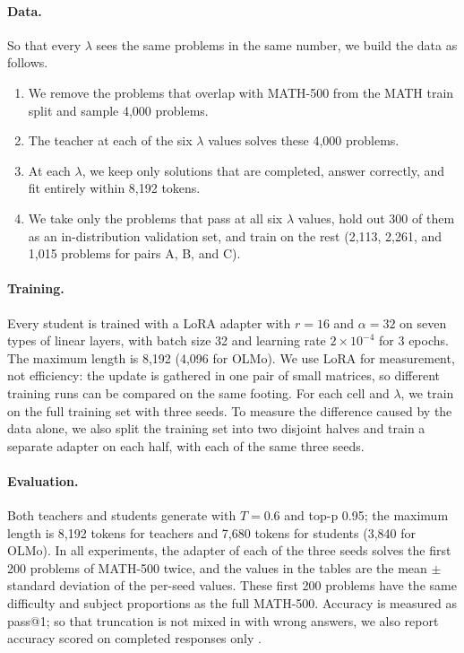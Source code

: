 \paragraph{Data.}
So that every $\lambda$ sees the same problems in the same number, we build the data as follows.
\begin{enumerate}
  \item We remove the problems that overlap with MATH-500 from the MATH train split and sample 4,000 problems.
  \item The teacher at each of the six $\lambda$ values solves these 4,000 problems.
  \item At each $\lambda$, we keep only solutions that are completed, answer correctly, and fit entirely within 8,192 tokens.
  \item We take only the problems that pass at all six $\lambda$ values, hold out 300 of them as an in-distribution validation set, and train on the rest (2,113, 2,261, and 1,015 problems for pairs A, B, and C).
\end{enumerate}

\paragraph{Training.}
Every student is trained with a LoRA adapter with $r=16$ and $\alpha=32$ on seven types of linear layers, with batch size 32 and learning rate $2\times10^{-4}$ for 3 epochs. The maximum length is 8,192 (4,096 for OLMo).
We use LoRA for measurement, not efficiency: the update is gathered in one pair of small matrices, so different training runs can be compared on the same footing.
For each cell and $\lambda$, we train on the full training set with three seeds. To measure the difference caused by the data alone, we also split the training set into two disjoint halves and train a separate adapter on each half, with each of the same three seeds.

\paragraph{Evaluation.}
Both teachers and students generate with $T=0.6$ and top-p 0.95; the maximum length is 8,192 tokens for teachers and 7,680 tokens for students (3,840 for OLMo).
In all experiments, the adapter of each of the three seeds solves the first 200 problems of MATH-500 twice, and the values in the tables are the mean $\pm$ standard deviation of the per-seed values.
These first 200 problems have the same difficulty and subject proportions as the full MATH-500.
Accuracy is measured as pass@1; so that truncation is not mixed in with wrong answers, we also report accuracy scored on completed responses only \citep{wang2026rollouts}.


